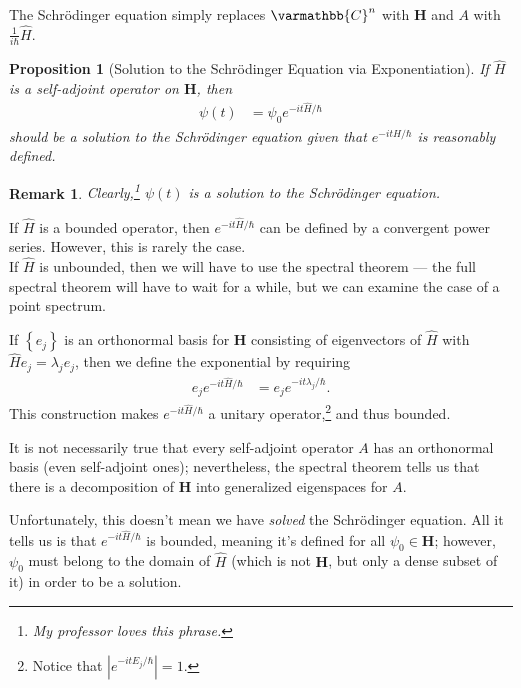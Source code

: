 \documentclass[12pt]{extarticle}
\newtheorem*{remark}{Remark}
\newcommand{\C}{\varmathbb{C}}
\newcommand{\set}[1]{\left\{#1\right\}}
\theoremstyle{plain}
\newtheorem*{proposition}{Proposition}%
\theoremstyle{definition}
\theoremstyle{remark}
\renewcommand{\newline}{\hfill\break}
\begin{document}
  The Schrödinger equation simply replaces $\C^{n}$ with $\mathbf{H}$ and $A$ with $\frac{1}{i\hbar}\hat{H}$.
  \begin{proposition}[Solution to the Schrödinger Equation via Exponentiation]
    If $\hat{H}$ is a self-adjoint operator on $\mathbf{H}$, then
    \begin{align*}
      \psi(t) &= \psi_0 e^{-it\hat{H}/\hbar}
    \end{align*}
    should be a solution to the Schrödinger equation given that $e^{-it\hat{H}/\hbar}$ is reasonably defined.
  \end{proposition}
  \begin{remark}
    Clearly,\footnote{My professor loves this phrase.} $\psi(t)$ is a solution to the Schrödinger equation.
  \end{remark}
  If $\hat{H}$ is a bounded operator, then $e^{-it\hat{H}/\hbar}$ can be defined by a convergent power series. However, this is rarely the case.\\

  If $\hat{H}$ is unbounded, then we will have to use the spectral theorem --- the full spectral theorem will have to wait for a while, but we can examine the case of a point spectrum.\newline

  If $\set{e_j}$ is an orthonormal basis for $\mathbf{H}$ consisting of eigenvectors of $\hat{H}$ with $\hat{H}e_j = \lambda_je_j$, then we define the exponential by requiring
  \begin{align*}
    e_je^{-it\hat{H}/\hbar} &= e_je^{-it\lambda_j/\hbar}.
  \end{align*}
  This construction makes $e^{-it\hat{H}/\hbar}$ a unitary operator,\footnote{Notice that $\left|e^{-itE_j/\hbar}\right| = 1$.} and thus bounded.\newline

  It is not necessarily true that every self-adjoint operator $A$ has an orthonormal basis (even self-adjoint ones); nevertheless, the spectral theorem tells us that there is a decomposition of $\mathbf{H}$ into generalized eigenspaces for $A$.\newline

  Unfortunately, this doesn't mean we have \textit{solved} the Schrödinger equation. All it tells us is that $e^{-it\hat{H}/\hbar}$ is bounded, meaning it's defined for all $\psi_0 \in \mathbf{H}$; however, $\psi_0$ must belong to the domain of $\hat{H}$ (which is not $\mathbf{H}$, but only a dense subset of it) in order to be a solution.\newline
\end{document}
